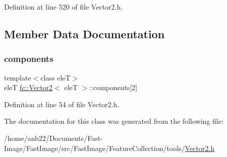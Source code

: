 Definition at line 520 of file Vector2.\+h.



\subsection{Member Data Documentation}
\mbox{\label{classfc_1_1Vector2_a71ab6c0b3889a5d50dc193cd43aa3334}} 
\subsubsection{\texorpdfstring{components}{components}}
{\footnotesize\ttfamily template$<$class eleT$>$ \\
eleT \hyperlink{classfc_1_1Vector2}{fc\+::\+Vector2}$<$ eleT $>$\+::components\mbox{[}2\mbox{]}\hspace{0.3cm}{\ttfamily [private]}}



Definition at line 54 of file Vector2.\+h.



The documentation for this class was generated from the following file\+:\begin{DoxyCompactItemize}
\item 
/home/anb22/\+Documents/\+Fast-\/\+Image/\+Fast\+Image/src/\+Fast\+Image/\+Feature\+Collection/tools/\hyperlink{Vector2_8h}{Vector2.\+h}\end{DoxyCompactItemize}
